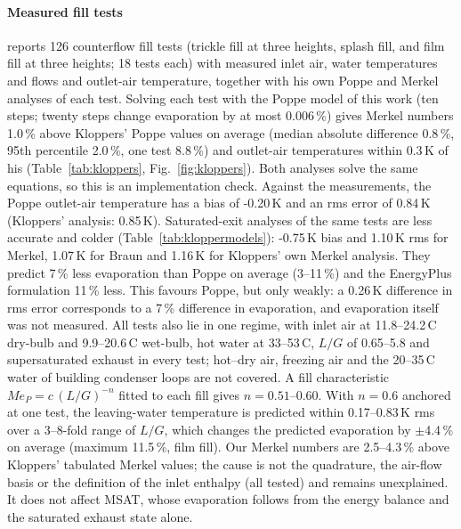 \documentclass[preprint,12pt]{elsarticle}
\begin{document}
\paragraph{Measured fill tests} \citet{kloppers2003critical} reports 126 counterflow fill tests (trickle fill at three
heights, splash fill, and film fill at three heights; 18 tests each) with measured inlet air, water temperatures and flows
and outlet-air temperature, together with his own Poppe and Merkel analyses of each test. Solving each test with the
Poppe model of this work (ten steps; twenty steps change evaporation by at most 0.006\,\%) gives Merkel numbers 1.0\,\%
above Kloppers' Poppe values on average (median absolute difference 0.8\,\%, 95th percentile 2.0\,\%, one test 8.8\,\%)
and outlet-air temperatures within 0.3\,K of his (Table~\ref{tab:kloppers}, Fig.~\ref{fig:kloppers}). Both analyses
solve the same equations, so this is an implementation check. Against the measurements, the Poppe outlet-air
temperature has a bias of -0.20\,K and an rms error of 0.84\,K (Kloppers' analysis: 0.85\,K). Saturated-exit analyses of
the same tests are less accurate and colder (Table~\ref{tab:kloppermodels}): -0.75\,K bias and 1.10\,K rms for Merkel,
1.07\,K for Braun and 1.16\,K for Kloppers' own Merkel analysis. They predict 7\,\% less evaporation than Poppe on
average (3--11\,\%) and the EnergyPlus formulation 11\,\% less. This favours Poppe, but only weakly: a 0.26\,K difference
in rms error corresponds to a 7\,\% difference in evaporation, and evaporation itself was not measured. All tests also lie
in one regime, with inlet air at 11.8--24.2\,\textdegree C dry-bulb and 9.9--20.6\,\textdegree C wet-bulb, hot water at
33--53\,\textdegree C, $L/G$ of 0.65--5.8 and supersaturated exhaust in every test; hot--dry air, freezing air and the
20--35\,\textdegree C water of building condenser loops are not covered. A fill characteristic $Me_P=c\,(L/G)^{-n}$ fitted
to each fill gives $n=0.51$--0.60. With $n=0.6$ anchored at one test, the leaving-water temperature is predicted within
0.17--0.83\,K rms over a 3--8-fold range of $L/G$, which changes the predicted evaporation by $\pm$4.4\,\% on average
(maximum 11.5\,\%, film fill). Our Merkel numbers are 2.5--4.3\,\% above Kloppers' tabulated Merkel values; the cause is not
the quadrature, the air-flow basis or the definition of the inlet enthalpy (all tested) and remains unexplained. It does
not affect MSAT, whose evaporation follows from the energy balance and the saturated exhaust state alone.
\end{document}
